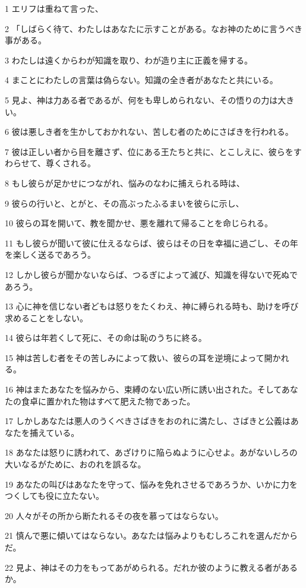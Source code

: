 \par 1 エリフは重ねて言った、
\par 2 「しばらく待て、わたしはあなたに示すことがある。なお神のために言うべき事がある。
\par 3 わたしは遠くからわが知識を取り、わが造り主に正義を帰する。
\par 4 まことにわたしの言葉は偽らない。知識の全き者があなたと共にいる。
\par 5 見よ、神は力ある者であるが、何をも卑しめられない、その悟りの力は大きい。
\par 6 彼は悪しき者を生かしておかれない、苦しむ者のためにさばきを行われる。
\par 7 彼は正しい者から目を離さず、位にある王たちと共に、とこしえに、彼らをすわらせて、尊くされる。
\par 8 もし彼らが足かせにつながれ、悩みのなわに捕えられる時は、
\par 9 彼らの行いと、とがと、その高ぶったふるまいを彼らに示し、
\par 10 彼らの耳を開いて、教を聞かせ、悪を離れて帰ることを命じられる。
\par 11 もし彼らが聞いて彼に仕えるならば、彼らはその日を幸福に過ごし、その年を楽しく送るであろう。
\par 12 しかし彼らが聞かないならば、つるぎによって滅び、知識を得ないで死ぬであろう。
\par 13 心に神を信じない者どもは怒りをたくわえ、神に縛られる時も、助けを呼び求めることをしない。
\par 14 彼らは年若くして死に、その命は恥のうちに終る。
\par 15 神は苦しむ者をその苦しみによって救い、彼らの耳を逆境によって開かれる。
\par 16 神はまたあなたを悩みから、束縛のない広い所に誘い出された。そしてあなたの食卓に置かれた物はすべて肥えた物であった。
\par 17 しかしあなたは悪人のうくべきさばきをおのれに満たし、さばきと公義はあなたを捕えている。
\par 18 あなたは怒りに誘われて、あざけりに陥らぬように心せよ。あがないしろの大いなるがために、おのれを誤るな。
\par 19 あなたの叫びはあなたを守って、悩みを免れさせるであろうか、いかに力をつくしても役に立たない。
\par 20 人々がその所から断たれるその夜を慕ってはならない。
\par 21 慎んで悪に傾いてはならない。あなたは悩みよりもむしろこれを選んだからだ。
\par 22 見よ、神はその力をもってあがめられる。だれか彼のように教える者があるか。
